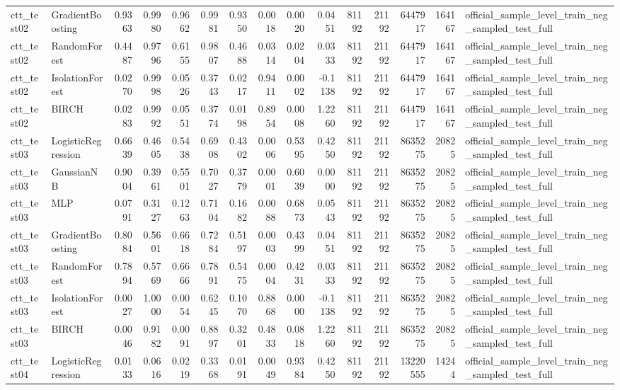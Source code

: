 \begin{tabular}{llrrrrrrrrrrrrl}
ctt\_test02 & GradientBoosting & 0.9363 & 0.9980 & 0.9662 & 0.9981 & 0.9350 & 0.0018 & 0.0020 & 0.0451 & 81192 & 21192 & 6447917 & 164167 & official\_sample\_level\_train\_neg\_sampled\_test\_full \\
ctt\_test02 & RandomForest & 0.4487 & 0.9796 & 0.6155 & 0.9807 & 0.4688 & 0.0314 & 0.0204 & 0.0333 & 81192 & 21192 & 6447917 & 164167 & official\_sample\_level\_train\_neg\_sampled\_test\_full \\
ctt\_test02 & IsolationForest & 0.0270 & 0.9998 & 0.0526 & 0.3743 & 0.0217 & 0.9411 & 0.0002 & -0.1138 & 81192 & 21192 & 6447917 & 164167 & official\_sample\_level\_train\_neg\_sampled\_test\_full \\
ctt\_test02 & BIRCH & 0.0283 & 0.9992 & 0.0551 & 0.3774 & 0.0198 & 0.8954 & 0.0008 & 1.2260 & 81192 & 21192 & 6447917 & 164167 & official\_sample\_level\_train\_neg\_sampled\_test\_full \\
ctt\_test03 & LogisticRegression & 0.6639 & 0.4605 & 0.5438 & 0.6908 & 0.4302 & 0.0006 & 0.5395 & 0.4250 & 81192 & 21192 & 8635275 & 20825 & official\_sample\_level\_train\_neg\_sampled\_test\_full \\
ctt\_test03 & GaussianNB & 0.9004 & 0.3961 & 0.5501 & 0.7027 & 0.3779 & 0.0001 & 0.6039 & 0.0000 & 81192 & 21192 & 8635275 & 20825 & official\_sample\_level\_train\_neg\_sampled\_test\_full \\
ctt\_test03 & MLP & 0.0791 & 0.3127 & 0.1263 & 0.7104 & 0.1682 & 0.0088 & 0.6873 & 0.0543 & 81192 & 21192 & 8635275 & 20825 & official\_sample\_level\_train\_neg\_sampled\_test\_full \\
ctt\_test03 & GradientBoosting & 0.8084 & 0.5601 & 0.6618 & 0.7284 & 0.5197 & 0.0003 & 0.4399 & 0.0451 & 81192 & 21192 & 8635275 & 20825 & official\_sample\_level\_train\_neg\_sampled\_test\_full \\
ctt\_test03 & RandomForest & 0.7894 & 0.5769 & 0.6666 & 0.7891 & 0.5475 & 0.0004 & 0.4231 & 0.0333 & 81192 & 21192 & 8635275 & 20825 & official\_sample\_level\_train\_neg\_sampled\_test\_full \\
ctt\_test03 & IsolationForest & 0.0027 & 1.0000 & 0.0054 & 0.6245 & 0.1070 & 0.8868 & 0.0000 & -0.1138 & 81192 & 21192 & 8635275 & 20825 & official\_sample\_level\_train\_neg\_sampled\_test\_full \\
ctt\_test03 & BIRCH & 0.0046 & 0.9182 & 0.0091 & 0.8897 & 0.3201 & 0.4833 & 0.0818 & 1.2260 & 81192 & 21192 & 8635275 & 20825 & official\_sample\_level\_train\_neg\_sampled\_test\_full \\
ctt\_test04 & LogisticRegression & 0.0133 & 0.0616 & 0.0219 & 0.3368 & 0.0191 & 0.0049 & 0.9384 & 0.4250 & 81192 & 21192 & 13220555 & 14244 & official\_sample\_level\_train\_neg\_sampled\_test\_full \\

\end{tabular}

